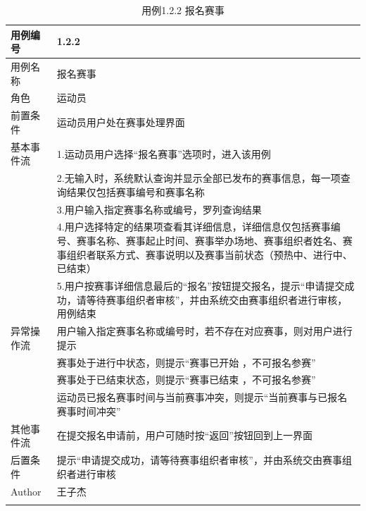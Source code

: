 \documentclass[a4paper,UTF8]{article}
\begin{document}
\begin{table}[!htbp]
	\begin{center}
		\caption{用例1.2.2 报名赛事}
		\label{table:Tab_uc122}
		\begin{tabular}{|p{}|p{}|}
			\hline\noalign{\smallskip}
			用例编号 & 1.2.2\\
			\hline
			用例名称 &  报名赛事\\
			\hline
			角色 & 运动员\\
			\hline
			前置条件 & 运动员用户处在赛事处理界面\\
			\hline
			基本事件流 & 1.运动员用户选择“报名赛事”选项时，进入该用例 \\& 2.无输入时，系统默认查询并显示全部已发布的赛事信息，每一项查询结果仅包括赛事编号和赛事名称 \\& 3.用户输入指定赛事名称或编号，罗列查询结果 \\& 4.用户选择特定的结果项查看其详细信息，详细信息仅包括赛事编号、赛事名称、赛事起止时间、赛事举办场地、赛事组织者姓名、赛事组织者联系方式、赛事说明以及赛事当前状态（预热中、进行中、已结束）\\& 5.用户按赛事详细信息最后的“报名”按钮提交报名，提示“申请提交成功，请等待赛事组织者审核”，并由系统交由赛事组织者进行审核，用例结束\\
			\hline
				异常操作流 & 用户输入指定赛事名称或编号时，若不存在对应赛事，则对用户进行提示 \\& 赛事处于进行中状态，则提示“赛事已开始 ，不可报名参赛” \\& 赛事处于已结束状态，则提示“赛事已结束 ，不可报名参赛” \\& 运动员已报名赛事时间与当前赛事冲突，则提示“当前赛事与已报名赛事时间冲突”\\
			\hline
			其他事件流 & 在提交报名申请前，用户可随时按“返回”按钮回到上一界面\\
			\hline
			后置条件 & 提示“申请提交成功，请等待赛事组织者审核”，并由系统交由赛事组织者进行审核\\
			\hline
			Author & 王子杰 \\
			\noalign{\smallskip}
			\hline
			\noalign{\smallskip}
		\end{tabular}
	\end{center}
\end{table}
\end{document}
